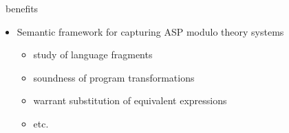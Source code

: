 \begin{frame}{\HTC\ benefits}
  \begin{itemize}
  \item Semantic framework for capturing ASP modulo theory systems
    \begin{itemize}\normalsize
    \item study of language fragments
    \item soundness of program transformations
    \item warrant substitution of equivalent expressions
    \item etc.
    \end{itemize}
  \end{itemize}
\end{frame}
%
